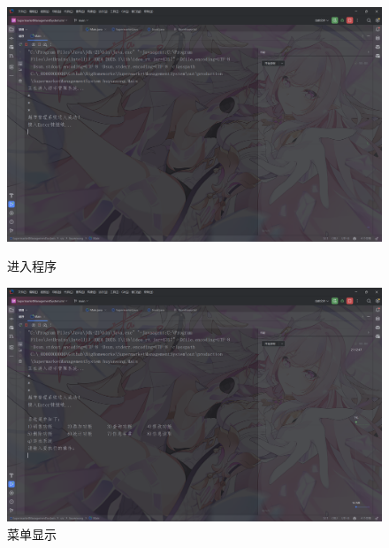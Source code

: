 \documentclass[12pt, a4paper, oneside]{ctexart}
\begin{document}
\begin{figure}[H]
    \begin{minipage}[t]{0.48\textwidth}
        \includegraphics[width=\textwidth]{images/进入程序.png}
        \caption*{进入程序}
    \end{minipage}
    \hfill
    \begin{minipage}[t]{0.48\textwidth}
        \includegraphics[width=\textwidth]{images/菜单显示.png}
        \caption*{菜单显示}
    \end{minipage}
\end{figure}
\end{document}
